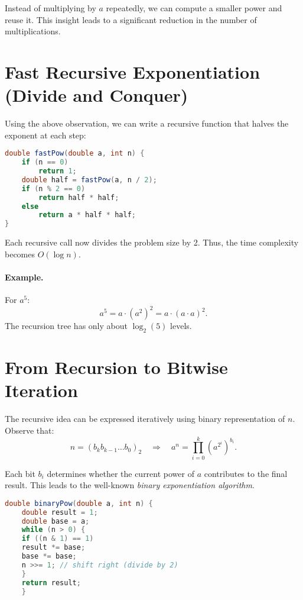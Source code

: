\documentclass[a4paper,12pt]{article}
\begin{document}
    Instead of multiplying by \( a \) repeatedly, we can compute a smaller power and reuse it.
    This insight leads to a significant reduction in the number of multiplications.

    \section{Fast Recursive Exponentiation (Divide and Conquer)}

    Using the above observation, we can write a recursive function that halves the exponent at each step:

    \begin{lstlisting}[language=Java, caption={Fast recursive exponentiation}]
double fastPow(double a, int n) {
    if (n == 0)
        return 1;
    double half = fastPow(a, n / 2);
    if (n % 2 == 0)
        return half * half;
    else
        return a * half * half;
}
    \end{lstlisting}

    Each recursive call now divides the problem size by 2.
    Thus, the time complexity becomes \( O(\log n) \).

    \paragraph{Example.}
    For \( a^5 \):
    \[
        a^5 = a \cdot (a^2)^2 = a \cdot (a \cdot a)^2.
    \]
    The recursion tree has only about \( \log_2(5) \) levels.

    \section{From Recursion to Bitwise Iteration}

    The recursive idea can be expressed iteratively using binary representation of \( n \).
    Observe that:
    \[
        n = (b_k b_{k-1} \ldots b_0)_2
        \quad \Rightarrow \quad
        a^n = \prod_{i=0}^{k} (a^{2^i})^{b_i}.
    \]

    Each bit \( b_i \) determines whether the current power of \( a \) contributes to the final result.
    This leads to the well-known \emph{binary exponentiation algorithm}.

    \begin{lstlisting}[language=Java, caption={Bitwise (iterative) exponentiation}]
    double binaryPow(double a, int n) {
    double result = 1;
    double base = a;
    while (n > 0) {
    if ((n & 1) == 1)
    result *= base;
    base *= base;
    n >>= 1; // shift right (divide by 2)
    }
    return result;
    }
\end{lstlisting}
\end{document}
